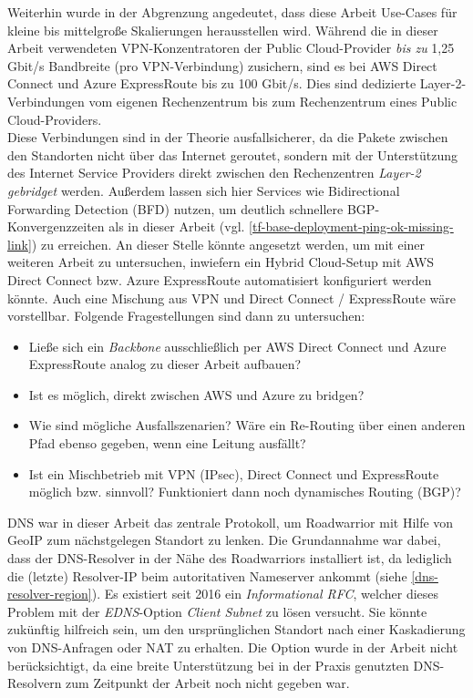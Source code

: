 Weiterhin wurde in der Abgrenzung angedeutet, dass diese Arbeit Use-Cases für kleine bis mittelgroße Skalierungen herausstellen wird. Während die in dieser Arbeit verwendeten VPN-Konzentratoren der Public Cloud-Provider \textit{bis zu} 1,25 Gbit/s Bandbreite (pro VPN-Verbindung) zusichern, sind es bei AWS Direct Connect \cite{awsdc2020} und Azure ExpressRoute \cite{Washam2014} bis zu 100 Gbit/s. Dies sind dedizierte Layer-2-Verbindungen vom eigenen Rechenzentrum bis zum Rechenzentrum eines Public Cloud-Providers.\\
Diese Verbindungen sind in der Theorie ausfallsicherer, da die Pakete zwischen den Standorten nicht über das Internet geroutet, sondern mit der Unterstützung des Internet Service Providers direkt zwischen den Rechenzentren \textit{Layer-2 gebridget} werden. Außerdem lassen sich hier Services wie Bidirectional Forwarding Detection (BFD) nutzen, um deutlich schnellere BGP-Konvergenzzeiten als in dieser Arbeit (vgl. \ref{tf-base-deployment-ping-ok-missing-link}) zu erreichen\cite{azurebfd2018}.
An dieser Stelle könnte angesetzt werden, um mit einer weiteren Arbeit zu untersuchen, inwiefern ein Hybrid Cloud-Setup mit AWS Direct Connect bzw. Azure ExpressRoute automatisiert konfiguriert werden könnte. Auch eine Mischung aus VPN und Direct Connect / ExpressRoute wäre vorstellbar. Folgende Fragestellungen sind dann zu untersuchen:
\begin{itemize}
    \item Ließe sich ein \textit{Backbone} ausschließlich per AWS Direct Connect und Azure ExpressRoute analog zu dieser Arbeit aufbauen?
    \item Ist es möglich, direkt zwischen AWS und Azure zu bridgen?
    \item Wie sind mögliche Ausfallszenarien? Wäre ein Re-Routing über einen anderen Pfad ebenso gegeben, wenn eine Leitung ausfällt?
    \item Ist ein Mischbetrieb mit VPN (IPsec), Direct Connect und ExpressRoute möglich bzw. sinnvoll? Funktioniert dann noch dynamisches Routing (BGP)?
\end{itemize}
DNS war in dieser Arbeit das zentrale Protokoll, um Roadwarrior mit Hilfe von GeoIP zum nächstgelegen Standort zu lenken. Die Grundannahme war dabei, dass der DNS-Resolver in der Nähe des Roadwarriors installiert ist, da lediglich die (letzte) Resolver-IP beim autoritativen Nameserver ankommt (siehe \ref{dns-resolver-region}). Es existiert seit 2016 ein \textit{Informational RFC}, welcher dieses Problem mit der \textit{EDNS}-Option \textit{Client Subnet} zu lösen versucht\cite{rfc7871}. Sie könnte zukünftig hilfreich sein, um den ursprünglichen Standort nach einer Kaskadierung von DNS-Anfragen oder NAT zu erhalten. Die Option wurde in der Arbeit nicht berücksichtigt, da eine breite Unterstützung bei in der Praxis genutzten DNS-Resolvern zum Zeitpunkt der Arbeit noch nicht gegeben war.\\ 
